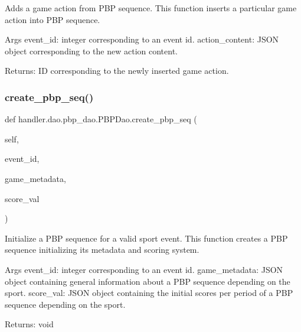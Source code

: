 \begin{DoxyVerb}Adds a game action from PBP sequence.
This function inserts a particular game action into PBP sequence.

Args
    event_id: integer corresponding to an event id.
    action_content: JSON object corresponding to the new action content.

Returns:
    ID corresponding to the newly inserted game action.
\end{DoxyVerb}
 \mbox{\label{classhandler_1_1dao_1_1pbp__dao_1_1_p_b_p_dao_ab5691fa252a6c95475ce1177e8524e58}} 
\subsubsection{\texorpdfstring{create\+\_\+pbp\+\_\+seq()}{create\_pbp\_seq()}}
{\footnotesize\ttfamily def handler.\+dao.\+pbp\+\_\+dao.\+P\+B\+P\+Dao.\+create\+\_\+pbp\+\_\+seq (\begin{DoxyParamCaption}\item[{}]{self,  }\item[{}]{event\+\_\+id,  }\item[{}]{game\+\_\+metadata,  }\item[{}]{score\+\_\+val }\end{DoxyParamCaption})}

\begin{DoxyVerb}Initialize a PBP sequence for a valid sport event.
This function creates a PBP sequence initializing its metadata and scoring system.

Args
    event_id: integer corresponding to an event id.
    game_metadata: JSON object containing general information about a PBP sequence depending on the sport.
    score_val: JSON object containing the initial scores per period of a PBP sequence depending on the sport.

Returns:
    void
\end{DoxyVerb}
 \mbox{\label{classhandler_1_1dao_1_1pbp__dao_1_1_p_b_p_dao_a8b192ac72466e526e818299c691eb114}} 
